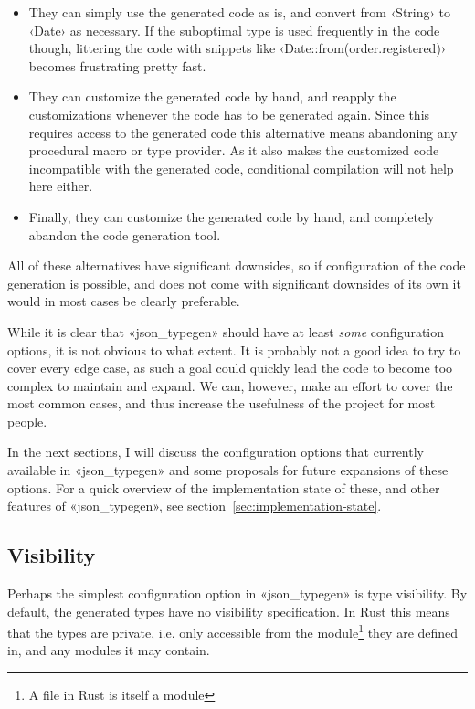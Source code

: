 \begin{itemize}
  \item They can simply use the generated code as is, and convert from ‹String› to ‹Date› as necessary. If the suboptimal type is used frequently in the code though, littering the code with snippets like ‹Date::from(order.registered)› becomes frustrating pretty fast.
  \item They can customize the generated code by hand, and reapply the customizations whenever the code has to be generated again. Since this requires access to the generated code this alternative means abandoning any procedural macro or type provider. As it also makes the customized code incompatible with the generated code, conditional compilation will not help here either.
  \item Finally, they can customize the generated code by hand, and completely abandon the code generation tool.
\end{itemize}

All of these alternatives have significant downsides, so if configuration of the code generation is possible, and does not come with significant downsides of its own it would in most cases be clearly preferable.

While it is clear that «json_typegen» should have at least \emph{some} configuration options, it is not obvious to what extent. It is probably not a good idea to try to cover every edge case, as such a goal could quickly lead the code to become too complex to maintain and expand. We can, however, make an effort to cover the most common cases, and thus increase the usefulness of the project for most people.

In the next sections, I will discuss the configuration options that currently available in «json_typegen» and some proposals for future expansions of these options. For a quick overview of the implementation state of these, and other features of «json_typegen», see section~\ref{sec:implementation-state}.

\subsection{Visibility}
\label{sec:visibility}

Perhaps the simplest configuration option in «json_typegen» is type visibility. By default, the generated types have no visibility specification. In Rust this means that the types are private, i.e. only accessible from the module\footnote{A file in Rust is itself a module} they are defined in, and any modules it may contain.


